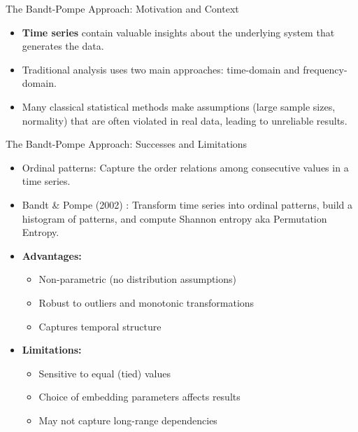 \documentclass{beamer}
\begin{document}
\begin{frame}{The Bandt-Pompe Approach: Motivation and Context}
	\begin{itemize}
		\item \textbf{Time series} contain valuable insights about the underlying system that generates the data.
		\item Traditional analysis uses two main approaches: time-domain and frequency-domain.
		\item Many classical statistical methods make assumptions (large sample sizes, normality) that are often violated in real data, leading to unreliable results.
	\end{itemize}
\end{frame}

\begin{frame}{The Bandt-Pompe Approach: Successes and Limitations}
	\begin{itemize}
		\item \alert{Ordinal patterns:} Capture the order relations among consecutive values in a time series.
		\item \alert{Bandt \& Pompe (2002) \cite{PhysRevLett.88.174102}:} Transform time series into ordinal patterns, build a histogram of patterns, and compute Shannon entropy aka Permutation Entropy.
		\item \textbf{Advantages:}
		\begin{itemize}
			\item Non-parametric (no distribution assumptions)
			\item Robust to outliers and monotonic transformations
			\item Captures temporal structure
		\end{itemize}
		\item \textbf{Limitations:}
		\begin{itemize}
			\item Sensitive to equal (tied) values
			\item Choice of embedding parameters affects results
			\item May not capture long-range dependencies
		\end{itemize}
	\end{itemize}
\end{frame}
\end{document}
